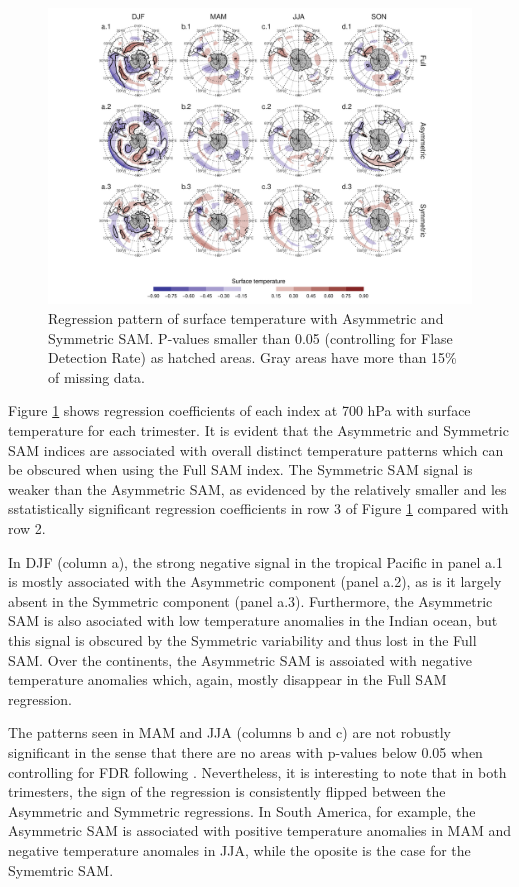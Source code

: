 \documentclass[]{ametsocV5}
\begin{document}
\begin{figure}
\includegraphics{regr-air-season-1} \caption[Regression pattern of surface temperature with Asymmetric and Symmetric SAM]{Regression pattern of surface temperature with Asymmetric and Symmetric SAM. P-values smaller than 0.05 (controlling for Flase Detection Rate) as hatched areas. Gray areas have more than 15\% of missing data.}\label{fig:regr-air-season}
\end{figure}

Figure \ref{fig:regr-air-season} shows regression coefficients of each
index at 700 hPa with surface temperature for each trimester. It is
evident that the Asymmetric and Symmetric SAM indices are associated
with overall distinct temperature patterns which can be obscured when
using the Full SAM index. The Symmetric SAM signal is weaker than the
Asymmetric SAM, as evidenced by the relatively smaller and les
sstatistically significant regression coefficients in row 3 of Figure
\ref{fig:regr-air-season} compared with row 2.

In DJF (column a), the strong negative signal in the tropical Pacific in
panel a.1 is mostly associated with the Asymmetric component (panel
a.2), as is it largely absent in the Symmetric component (panel a.3).
Furthermore, the Asymmetric SAM is also asociated with low temperature
anomalies in the Indian ocean, but this signal is obscured by the
Symmetric variability and thus lost in the Full SAM. Over the
continents, the Asymmetric SAM is assoiated with negative temperature
anomalies which, again, mostly disappear in the Full SAM regression.

The patterns seen in MAM and JJA (columns b and c) are not robustly
significant in the sense that there are no areas with p-values below
0.05 when controlling for FDR following \citet{wilks2016}. Nevertheless,
it is interesting to note that in both trimesters, the sign of the
regression is consistently flipped between the Asymmetric and Symmetric
regressions. In South America, for example, the Asymmetric SAM is
associated with positive temperature anomalies in MAM and negative
temperature anomales in JJA, while the oposite is the case for the
Symemtric SAM.
\end{document}
